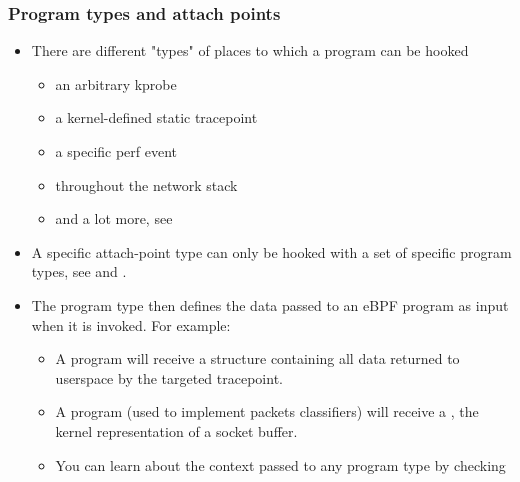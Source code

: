 \begin{frame}[fragile]
  \frametitle{Program types and attach points}
  \begin{itemize}
    \item There are different "types" of places to which a program can be
    hooked
    \begin{itemize}
      \item an arbitrary kprobe
      \item a kernel-defined static tracepoint
      \item a specific perf event
      \item throughout the network stack
      \item and a lot more, see 
    \end{itemize}
    \item A specific attach-point type can only be hooked with a set of
    specific program types, see  and
    .
    \item The program type then defines the data passed to an eBPF program as
    input when it is invoked. For example:
    \begin{itemize}
      \item A  program will receive a structure
      containing all data returned to userspace by the targeted tracepoint.
      \item A  program (used to implement packets
      classifiers) will receive a , the kernel
      representation of a socket buffer.
      \item You can learn about the context passed to any program type by
      checking 
    \end{itemize}
  \end{itemize}
\end{frame}

